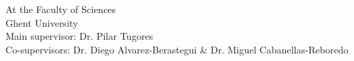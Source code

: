 \begin{titlepage}
\begin{center}
\begin{center}
    At the Faculty of Sciences\\
    Ghent University\\[1.5cm]
  
    Main supervisor: Dr. Pilar Tugores\\
    Co-supervisors: Dr. Diego Alvarez-Berastegui \& Dr. Miguel Cabanellas-Reboredo


    \end{center}
  \end{center}

\end{titlepage}
